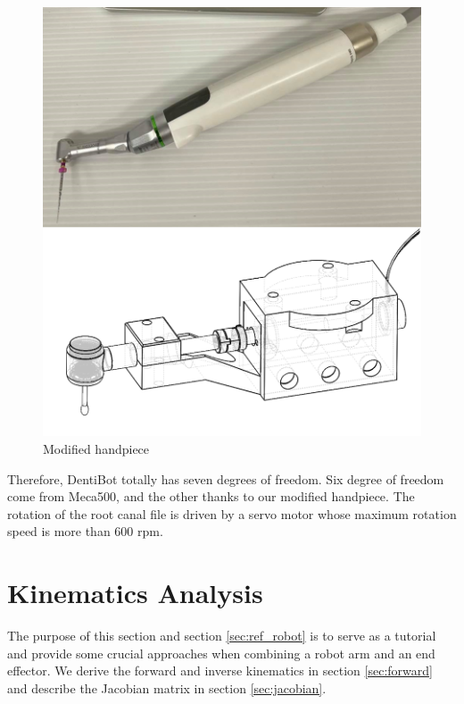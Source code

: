 \par
\begin{figure}[htbp]
\begin{center}
\includegraphics[width=0.7\linewidth]{Images/modified_handpiece.png}
\caption{
Modified handpiece
}\label{fig:modified_handpiece}
\end{center}
\end{figure}	
Therefore, DentiBot totally has seven degrees of freedom. Six degree of freedom come from Meca500, and the other thanks to our modified handpiece. The rotation of the root canal file is driven by a servo motor whose maximum rotation speed is more than 600 rpm.
																
\section{Kinematics Analysis}
\label{sec:kinematics}
\hspace*{6mm}The purpose of this section and section \ref{sec:ref_robot} is to serve as a tutorial and provide some crucial approaches when combining a robot arm and an end effector. We derive the forward and inverse kinematics in section \ref{sec:forward} and describe the Jacobian matrix in section \ref{sec:jacobian}. 
